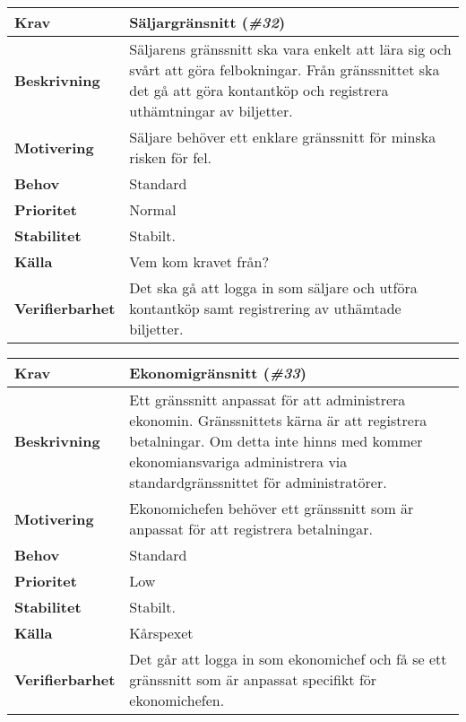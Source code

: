 \documentclass[a4paper, twoside, 11pt, titlepage]{article}
\begin{document}
	\begin{tabular} { p{2.6cm} p{12.5cm} }
		\hline
		\sffamily\textbf{Krav} & Säljargränsnitt (\emph{\#32})  \\
		\hline
		\sffamily\textbf{Beskrivning} & Säljarens gränssnitt ska vara enkelt att lära sig och svårt att göra felbokningar. Från gränssnittet ska det gå att göra kontantköp och registrera uthämtningar av biljetter.  \\
		\hline
		\sffamily\textbf{Motivering} & Säljare behöver ett enklare gränssnitt för minska risken för fel.  \\
		\hline
		\sffamily\textbf{Behov} & Standard  \\
		\hline
		\sffamily\textbf{Prioritet} & Normal  \\
		\hline
		\sffamily\textbf{Stabilitet} & Stabilt.  \\
		\hline
		\sffamily\textbf{Källa} & Vem kom kravet från?  \\
		\hline
		\sffamily\textbf{Verifierbarhet} & Det ska gå att logga in som säljare och utföra kontantköp samt registrering av uthämtade biljetter.  \\
		\hline
	\end{tabular}
	\vspace{6mm}

	\begin{tabular} { p{2.6cm} p{12.5cm} }
		\hline
		\sffamily\textbf{Krav} & Ekonomigränsnitt (\emph{\#33})  \\
		\hline
		\sffamily\textbf{Beskrivning} & Ett gränssnitt anpassat för att administrera ekonomin. Gränssnittets kärna är att registrera betalningar. Om detta inte hinns med kommer ekonomiansvariga administrera via standardgränssnittet för administratörer.  \\
		\hline
		\sffamily\textbf{Motivering} & Ekonomichefen behöver ett gränssnitt som är anpassat för att registrera betalningar.  \\
		\hline
		\sffamily\textbf{Behov} & Standard  \\
		\hline
		\sffamily\textbf{Prioritet} & Low  \\
		\hline
		\sffamily\textbf{Stabilitet} & Stabilt.  \\
		\hline
		\sffamily\textbf{Källa} & Kårspexet  \\
		\hline
		\sffamily\textbf{Verifierbarhet} & Det går att logga in som ekonomichef och få se ett gränssnitt som är anpassat specifikt för ekonomichefen.  \\
		\hline
	\end{tabular}
\end{document}
